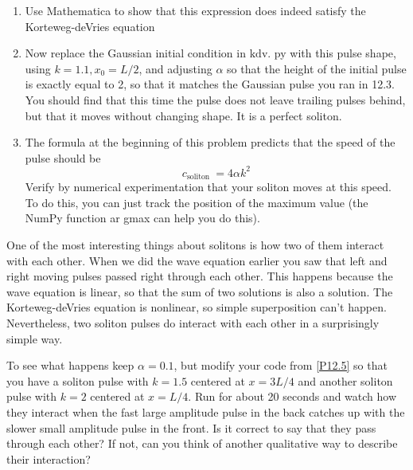 \begin{problem}\label{P12.5}
\begin{enumerate}[label=(\alph*)]
\item Use Mathematica to show that this expression does indeed satisfy the
Korteweg-deVries equation
\item Now replace the Gaussian initial condition in $\mathrm{kdv}$. py with this pulse shape, using $k=1.1, x_{0}=L / 2$, and adjusting $\alpha$ so that the height of the initial pulse is exactly equal to 2, so that it matches the Gaussian pulse you ran in 12.3. You should find that this time the pulse does not leave trailing pulses behind, but that it moves without changing shape. It is a perfect soliton.
\item The formula at the beginning of this problem predicts that the speed of the pulse should be 
\begin{equation}\label{eq:1215}
c_{\text {soliton }}=4 \alpha k^{2}
\end{equation}
Verify by numerical experimentation that your soliton moves at this speed. To do this, you can just track the position of the maximum value (the NumPy function ar gmax can help you do this).
\end{enumerate}
\end{problem}
\begin{problem}\label{P12.6}
One of the most interesting things about solitons is how two of them interact with each other. When we did the wave equation earlier you saw that left and right moving pulses passed right through each other. This happens because the wave equation is linear, so that the sum of two solutions is also a solution. The Korteweg-deVries equation is nonlinear, so simple superposition can't happen. Nevertheless, two soliton pulses do interact with each other in a surprisingly simple way.

To see what happens keep $\alpha=0.1$, but modify your code from \ref{P12.5} so that you have a soliton pulse with $k=1.5$ centered at $x=3 L / 4$ and another soliton pulse with $k=2$ centered at $x=L / 4$. Run for about 20 seconds and watch how they interact when the fast large amplitude pulse in the back catches up with the slower small amplitude pulse in the front. Is it correct to say that they pass through each other? If not, can you think of another qualitative way to describe their interaction?
\end{problem}
